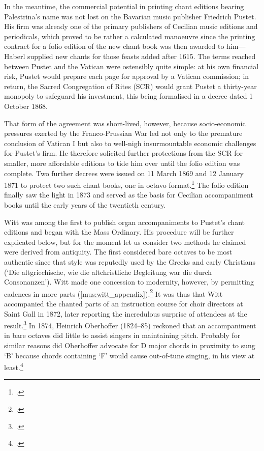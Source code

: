 In the meantime, the commercial potential in printing chant editions bearing Palestrina's name was not lost on the Bavarian music publisher Friedrich Pustet.
His firm was already one of the primary publishers of Cecilian music editions and periodicals, which proved to be rather a calculated manoeuvre since the printing contract for a folio edition of the new chant book was then awarded to him---Haberl supplied new chants for those feasts added after 1615.
The terms reached between Pustet and the Vatican were ostensibly quite simple: at his own financial risk, Pustet would prepare each page for approval by a Vatican commission; in return, the Sacred Congregation of Rites (SCR) would grant Pustet a thirty-year monopoly to safeguard his investment, this being formalised in a decree dated 1 October 1868.

That form of the agreement was short-lived, however, because socio-economic pressures exerted by the Franco-Prussian War led not only to the premature conclusion of Vatican I but also to well-nigh insurmountable economic challenges for Pustet's firm.
He therefore solicited further protections from the SCR for smaller, more affordable editions to tide him over until the folio edition was complete.
Two further decrees were issued on 11 March 1869 and 12 January 1871 to protect two such chant books, one in octavo format.\footcites[pp.~xix--xx, p.~xx n.~10, p.~ 69]{EllisPoliticsPlainchantfindesiecle2013}[For the SCR's decrees see][150--4]{HayburnPapalLegislationSacred1979}
The folio edition finally saw the light in 1873 and served as the basis for Cecilian accompaniment books until the early years of the twentieth century.

%
Witt was among the first to publish organ accompaniments to Pustet's chant editions and began with the Mass Ordinary.
His procedure will be further explicated below, but for the moment let us consider two methods he claimed were derived from antiquity.
The first considered bare octaves to be most authentic since that style was reputedly used by the Greeks and early Christians (`Die altgriechische, wie die altchristliche Begleitung war die durch Consonanzen').
Witt made one concession to modernity, however, by permitting cadences in more parts (\cref{mus:witt_appendix}).\footcite[p.~iv \S{}3, pp.~99--100 ]{WittOrganumcomitansad1872}
It was thus that Witt accompanied the chanted parts of an instruction course for choir directors at Saint Gall in 1872, later reporting the incredulous surprise of attendees at the result.\footcite[26]{WittMeineCaecilienfahrt18721873}
%
In 1874, Heinrich Oberhoffer (1824--85) reckoned that an accompaniment in bare octaves did little to assist singers in maintaining pitch.
Probably for similar reasons did Oberhoffer advocate for D major chords in proximity to sung `B'\kern 1pt\natural{} because chords containing `F'\kern 1pt\natural{} would cause out-of-tune singing, in his view at least.\footcite[82, 101]{OberhofferSchulekatholischenOrganisten1874}

